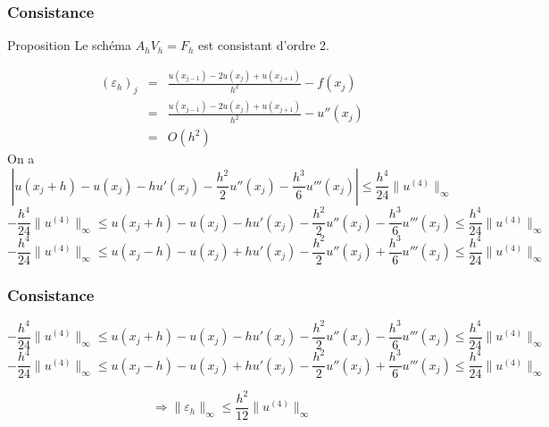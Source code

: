 \documentclass{beamer}
\begin{document}
 \begin{frame}
  \frametitle{Consistance}
  \begin{block}{Proposition}
  Le schéma $A_h V_h =F_h$  est consistant d'ordre 2.
  \end{block}
  \[\begin{array}{lll}
  (\varepsilon_h)_j&=&\displaystyle  \frac{u(x_{j-1})-2u(x_j)+u(x_{j+1})}{h^2}-f(x_j)\\
  &=&\displaystyle   \frac{u(x_{j-1})-2u(x_j)+u(x_{j+1})}{h^2}-u''(x_j)\\
  &=& O(h^2)
  \end{array}\]
  On a
  \[\left|u(x_j+h)-u(x_j)-hu'(x_j)-\frac{h^2}{2}u''(x_j)-\frac{h^3}{6}u'''(x_j)\right|\leq \frac{h^4}{24}\|u^{(4)}\|_{\infty}\]
  \[- \frac{h^4}{24}\|u^{(4)}\|_{\infty}\leq u(x_j+h)-u(x_j)-hu'(x_j)-\frac{h^2}{2}u''(x_j)-\frac{h^3}{6}u'''(x_j)\leq \frac{h^4}{24}\|u^{(4)}\|_{\infty}\]
   \[- \frac{h^4}{24}\|u^{(4)}\|_{\infty}\leq u(x_j-h)-u(x_j)+hu'(x_j)-\frac{h^2}{2}u''(x_j)+\frac{h^3}{6}u'''(x_j)\leq \frac{h^4}{24}\|u^{(4)}\|_{\infty}\]
 
 
 \end{frame} 

 \begin{frame}
  \frametitle{Consistance}
  \[- \frac{h^4}{24}\|u^{(4)}\|_{\infty}\leq u(x_j+h)-u(x_j)-hu'(x_j)-\frac{h^2}{2}u''(x_j)-\frac{h^3}{6}u'''(x_j)\leq \frac{h^4}{24}\|u^{(4)}\|_{\infty}\]
   \[- \frac{h^4}{24}\|u^{(4)}\|_{\infty}\leq u(x_j-h)-u(x_j)+hu'(x_j)-\frac{h^2}{2}u''(x_j)+\frac{h^3}{6}u'''(x_j)\leq \frac{h^4}{24}\|u^{(4)}\|_{\infty}\]

   \[\Longrightarrow \|\varepsilon_h\|_{\infty} \leq \frac{h^2}{12} \|u^{(4)}\|_{\infty}\] 
   
  
 
 
 \end{frame} 
 
\end{document}

